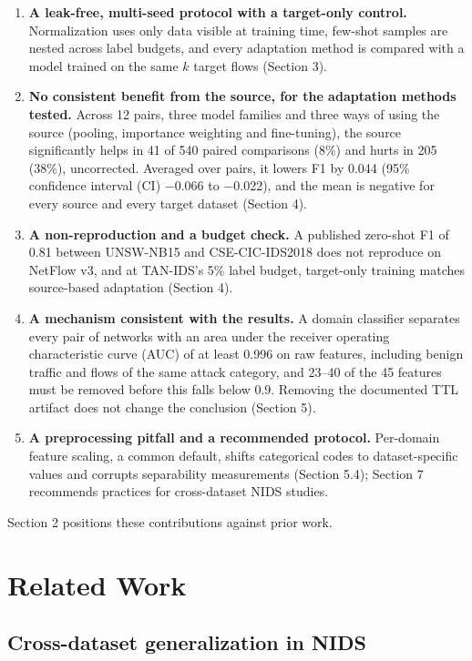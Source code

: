 \documentclass[11pt]{article}
\begin{document}
\begin{enumerate}
\item \textbf{A leak-free, multi-seed protocol with a target-only control.} Normalization uses only data visible at training time, few-shot samples are nested across label budgets, and every adaptation method is compared with a model trained on the same $k$ target flows (Section 3).
\item \textbf{No consistent benefit from the source, for the adaptation methods tested.} Across 12 pairs, three model families and three ways of using the source (pooling, importance weighting and fine-tuning), the source significantly helps in 41 of 540 paired comparisons (8\%) and hurts in 205 (38\%), uncorrected. Averaged over pairs, it lowers F1 by 0.044 (95\% confidence interval (CI) $-$0.066 to $-$0.022), and the mean is negative for every source and every target dataset (Section 4).
\item \textbf{A non-reproduction and a budget check.} A published zero-shot F1 of 0.81 between UNSW-NB15 and CSE-CIC-IDS2018 does not reproduce on NetFlow v3, and at TAN-IDS's 5\% label budget, target-only training matches source-based adaptation (Section 4).
\item \textbf{A mechanism consistent with the results.} A domain classifier separates every pair of networks with an area under the receiver operating characteristic curve (AUC) of at least 0.996 on raw features, including benign traffic and flows of the same attack category, and 23--40 of the 45 features must be removed before this falls below 0.9. Removing the documented TTL artifact does not change the conclusion (Section 5).
\item \textbf{A preprocessing pitfall and a recommended protocol.} Per-domain feature scaling, a common default, shifts categorical codes to dataset-specific values and corrupts separability measurements (Section 5.4); Section 7 recommends practices for cross-dataset NIDS studies.
\end{enumerate}

Section 2 positions these contributions against prior work.

\section{Related Work}

\subsection{Cross-dataset generalization in NIDS}
\end{document}
